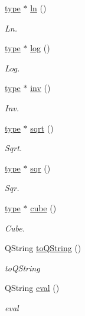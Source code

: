 \begin{DoxyCompactItemize}
\hyperlink{classtype}{type} $\ast$ \hyperlink{classrationnel_a59b1b593905de8676db02d5d2a5554c3}{ln} ()
\begin{DoxyCompactList}\small\item\em Ln. \end{DoxyCompactList}\item 
\hyperlink{classtype}{type} $\ast$ \hyperlink{classrationnel_a6bed14bda0b8546528454e7b2030645d}{log} ()
\begin{DoxyCompactList}\small\item\em Log. \end{DoxyCompactList}\item 
\hyperlink{classtype}{type} $\ast$ \hyperlink{classrationnel_a75336cd670c61195c833f8459c02c3b5}{inv} ()
\begin{DoxyCompactList}\small\item\em Inv. \end{DoxyCompactList}\item 
\hyperlink{classtype}{type} $\ast$ \hyperlink{classrationnel_ad37ab4380b5ff66104748ecc0bf5babe}{sqrt} ()
\begin{DoxyCompactList}\small\item\em Sqrt. \end{DoxyCompactList}\item 
\hyperlink{classtype}{type} $\ast$ \hyperlink{classrationnel_ab9f341fd09499253dd1f9b6f15795576}{sqr} ()
\begin{DoxyCompactList}\small\item\em Sqr. \end{DoxyCompactList}\item 
\hyperlink{classtype}{type} $\ast$ \hyperlink{classrationnel_a9bca6086c4a5083765d87324418a86ab}{cube} ()
\begin{DoxyCompactList}\small\item\em Cube. \end{DoxyCompactList}\item 
Q\-String \hyperlink{classrationnel_a6c905c688ae54647074a5ddf3ef648bd}{to\-Q\-String} ()
\begin{DoxyCompactList}\small\item\em to\-Q\-String \end{DoxyCompactList}\item 
Q\-String \hyperlink{classrationnel_a1418b1d6ac37f7948affefa7b8d0f314}{eval} ()
\begin{DoxyCompactList}\small\item\em eval \end{DoxyCompactList}\item 

\end{DoxyCompactItemize}

